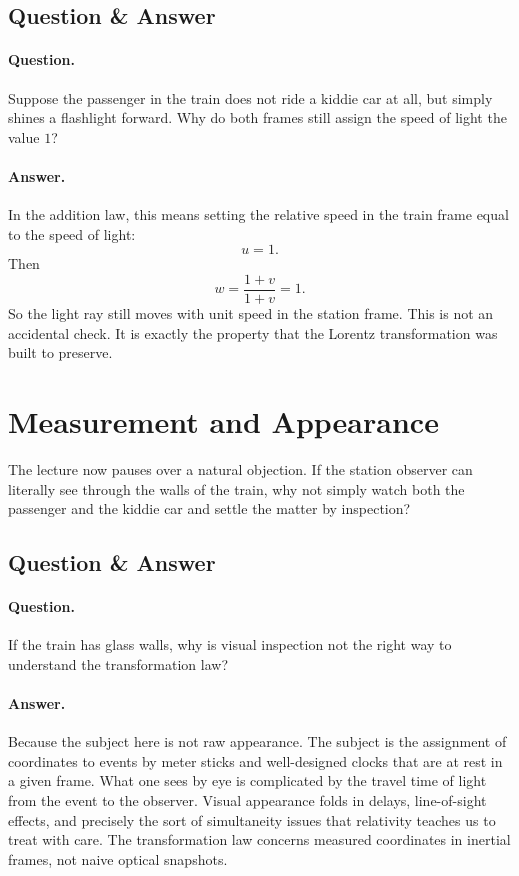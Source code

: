 \subsection{Question \& Answer}

\paragraph{Question.} Suppose the passenger in the train does not ride a kiddie car at all, but simply shines a flashlight forward. Why do both frames still assign the speed of light the value \(1\)?

\paragraph{Answer.} In the addition law, this means setting the relative speed in the train frame equal to the speed of light:
\begin{equation}
u=1.
\end{equation}
Then
\begin{equation}
w=\frac{1+v}{1+v}=1.
\end{equation}
So the light ray still moves with unit speed in the station frame. This is not an accidental check. It is exactly the property that the Lorentz transformation was built to preserve.

\section{Measurement and Appearance}

The lecture now pauses over a natural objection. If the station observer can literally see through the walls of the train, why not simply watch both the passenger and the kiddie car and settle the matter by inspection?

\subsection{Question \& Answer}

\paragraph{Question.} If the train has glass walls, why is visual inspection not the right way to understand the transformation law?

\paragraph{Answer.} Because the subject here is not raw appearance. The subject is the assignment of coordinates to events by meter sticks and well-designed clocks that are at rest in a given frame. What one sees by eye is complicated by the travel time of light from the event to the observer. Visual appearance folds in delays, line-of-sight effects, and precisely the sort of simultaneity issues that relativity teaches us to treat with care. The transformation law concerns measured coordinates in inertial frames, not naive optical snapshots.

